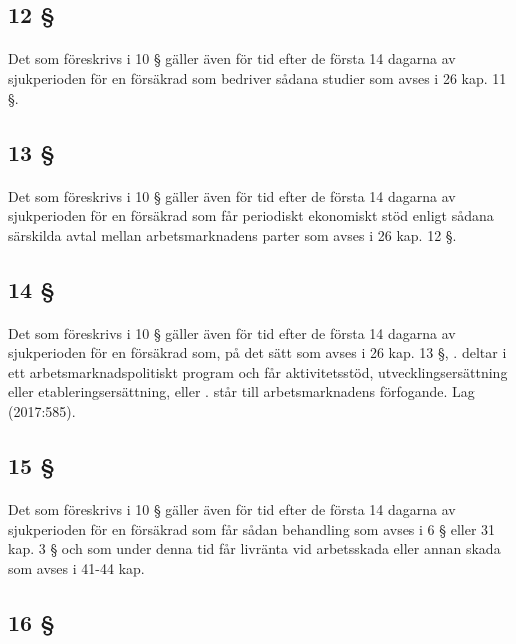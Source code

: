\documentclass[a4paper,notitlepage,openany,10pt]{book}
\begin{document}
\subsection*{12 §}
\paragraph*{}
Det som föreskrivs i 10 § gäller även för tid efter de första 14 dagarna av sjukperioden för en försäkrad som bedriver sådana studier som avses i 26 kap. 11 §.
\subsection*{13 §}
\paragraph*{}
Det som föreskrivs i 10 § gäller även för tid efter de första 14 dagarna av sjukperioden för en försäkrad som får periodiskt ekonomiskt stöd enligt sådana särskilda avtal mellan arbetsmarknadens parter som avses i 26 kap. 12 §.
\subsection*{14 §}
\paragraph*{}
Det som föreskrivs i 10 § gäller även för tid efter de första 14 dagarna av sjukperioden för en försäkrad som, på det sätt som avses i 26 kap. 13 §,
. deltar i ett arbetsmarknadspolitiskt program och får aktivitetsstöd, utvecklingsersättning eller etableringsersättning, eller
. står till arbetsmarknadens förfogande.
Lag (2017:585).
\subsection*{15 §}
\paragraph*{}
Det som föreskrivs i 10 § gäller även för tid efter de första 14 dagarna av sjukperioden för en försäkrad som får sådan behandling som avses i 6 § eller 31 kap. 3 § och som under denna tid får livränta vid arbetsskada eller annan skada som avses i 41-44 kap.
\subsection*{16 §}
\end{document}
